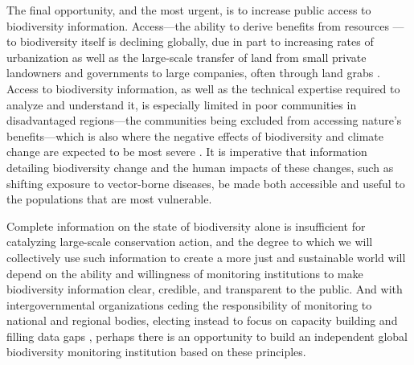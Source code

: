 The final opportunity, and the most urgent, is to increase public access to biodiversity information. Access—the ability to derive benefits from resources \cite{Ribot2009-wm}—to biodiversity itself is declining globally, due in part to increasing rates of urbanization \cite{United_Nations_Population_Division_undated-nr, Bratman2019-hi} as well as the large-scale transfer of land from small private landowners and governments to large companies, often through land grabs \cite{Peluso2011-rl, Borras2012-gr, Wolford2013-vh}. Access to biodiversity information, as well as the technical expertise required to analyze and understand it, is especially limited in poor communities in disadvantaged regions—the communities being excluded from accessing nature's benefits—which is also where the negative effects of biodiversity and climate change are expected to be most severe \cite{Borras2012-or, Richardson2016-lq, Barbier2018-nw, IPBES2019-hl}. It is imperative that information detailing biodiversity change and the human impacts of these changes, such as shifting exposure to vector-borne diseases, be made both accessible and useful to the populations that are most vulnerable.

Complete information on the state of biodiversity alone is insufficient for catalyzing large-scale conservation action, and the degree to which we will collectively use such information to create a more just and sustainable world will depend on the ability and willingness of monitoring institutions to make biodiversity information clear, credible, and transparent to the public. And with intergovernmental organizations ceding the responsibility of monitoring to national and regional bodies, electing instead to focus on capacity building and filling data gaps \cite{Larigauderie2010-rp, Scholes2012-ec}, perhaps there is an opportunity to build an independent global biodiversity monitoring institution based on these principles.